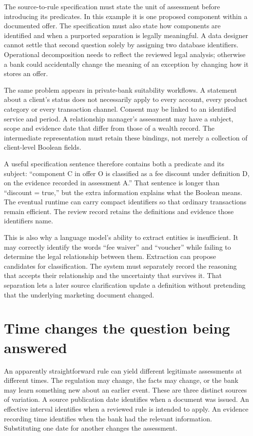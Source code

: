 The source-to-rule specification must state the unit of assessment before
introducing its predicates. In this example it is one proposed component within
a documented offer. The specification must also state how components are
identified and when a purported separation is legally meaningful. A data
designer cannot settle that second question solely by assigning two database
identifiers. Operational decomposition needs to reflect the reviewed legal
analysis; otherwise a bank could accidentally change the meaning of an exception
by changing how it stores an offer.

The same problem appears in private-bank suitability workflows. A statement
about a client's status does not necessarily apply to every account, every
product category or every transaction channel. Consent may be linked to an
identified service and period. A relationship manager's assessment may have a
subject, scope and evidence date that differ from those of a wealth record.
The intermediate representation must retain these bindings, not merely a
collection of client-level Boolean fields.

A useful specification sentence therefore contains both a predicate and its
subject: ``component C in offer O is classified as a fee discount under
definition D, on the evidence recorded in assessment A.'' That sentence is longer
than ``discount = true,'' but the extra information explains what the Boolean
means. The eventual runtime can carry compact identifiers so that ordinary
transactions remain efficient. The review record retains the definitions and
evidence those identifiers name.

This is also why a language model's ability to extract entities is insufficient.
It may correctly identify the words ``fee waiver'' and ``voucher'' while failing
to determine the legal relationship between them. Extraction can propose
candidates for classification. The system must separately record the reasoning
that accepts their relationship and the uncertainty that survives it. That
separation lets a later source clarification update a definition without
pretending that the underlying marketing document changed.

\section{Time changes the question being answered}
\label{sec:problem-time}
An apparently straightforward rule can yield different legitimate assessments
at different times. The regulation may change, the facts may change, or the
bank may learn something new about an earlier event. These are three distinct
sources of variation. A source publication date identifies when a document was
issued. An effective interval identifies when a reviewed rule is intended to
apply. An evidence recording time identifies when the bank had the relevant
information. Substituting one date for another changes the assessment.

